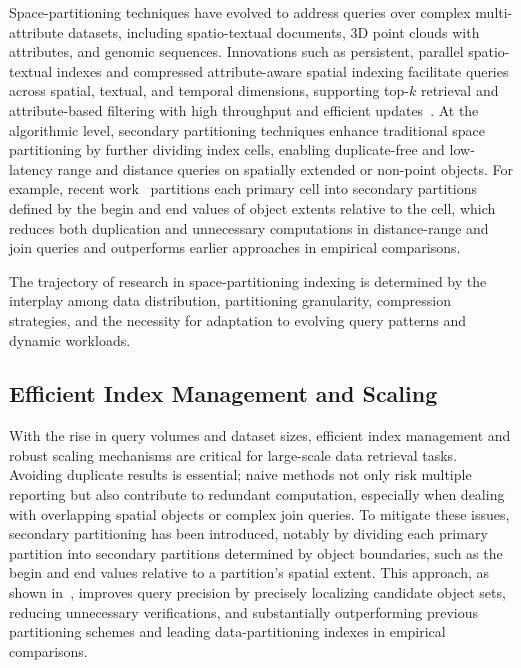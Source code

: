 \documentclass[sigconf]{acmart}
\begin{document}
Space-partitioning techniques have evolved to address queries over complex multi-attribute datasets, including spatio-textual documents, 3D point clouds with attributes, and genomic sequences. Innovations such as persistent, parallel spatio-textual indexes and compressed attribute-aware spatial indexing facilitate queries across spatial, textual, and temporal dimensions, supporting top-$k$ retrieval and attribute-based filtering with high throughput and efficient updates~\cite{ref50,ref51,ref75,ref98,ref114,ref118}. At the algorithmic level, secondary partitioning techniques enhance traditional space partitioning by further dividing index cells, enabling duplicate-free and low-latency range and distance queries on spatially extended or non-point objects. For example, recent work~\cite{ref114} partitions each primary cell into secondary partitions defined by the begin and end values of object extents relative to the cell, which reduces both duplication and unnecessary computations in distance-range and join queries and outperforms earlier approaches in empirical comparisons.

The trajectory of research in space-partitioning indexing is determined by the interplay among data distribution, partitioning granularity, compression strategies, and the necessity for adaptation to evolving query patterns and dynamic workloads.

\subsection{Efficient Index Management and Scaling}

With the rise in query volumes and dataset sizes, efficient index management and robust scaling mechanisms are critical for large-scale data retrieval tasks. Avoiding duplicate results is essential; naive methods not only risk multiple reporting but also contribute to redundant computation, especially when dealing with overlapping spatial objects or complex join queries. To mitigate these issues, secondary partitioning has been introduced, notably by dividing each primary partition into secondary partitions determined by object boundaries, such as the begin and end values relative to a partition's spatial extent. This approach, as shown in~\cite{ref114}, improves query precision by precisely localizing candidate object sets, reducing unnecessary verifications, and substantially outperforming previous partitioning schemes and leading data-partitioning indexes in empirical comparisons.
\end{document}

